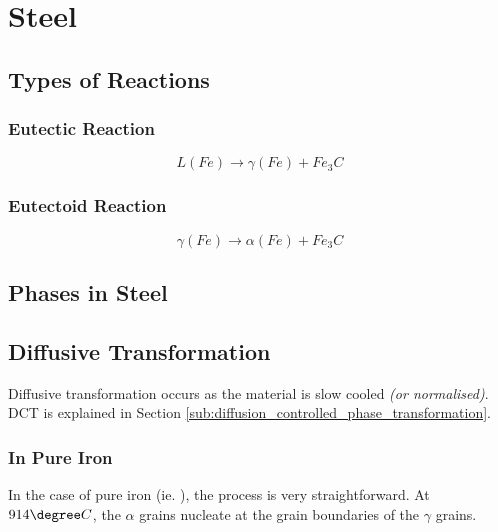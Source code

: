 \section{Steel} %
\label{sec:steel}


\subsection{Types of Reactions} %
\label{sub:types_of_reactions}

\subsubsection{Eutectic Reaction}
\begin{equation}
  L(Fe) \rightarrow \gamma(Fe) + Fe_3C
\end{equation}
\subsubsection{Eutectoid Reaction}
\begin{equation}
  \gamma(Fe) \rightarrow \alpha(Fe) + Fe_3C
\end{equation}

\subsection{Phases in Steel} %
\label{sub:phases_in_steel}



\subsection{Diffusive Transformation} %
\label{sub:diffusive_transformation}

Diffusive transformation occurs as the material is slow cooled \emph{(or normalised)}. DCT is explained in Section \ref{sub:diffusion_controlled_phase_transformation}.

\subsubsection{In Pure Iron} %
\label{ssub:subsubsection_name}


In the case of pure iron (ie. ), the process is very straightforward. At $914\degree C$, the $\alpha$ grains nucleate at the grain boundaries of the $\gamma$ grains.

